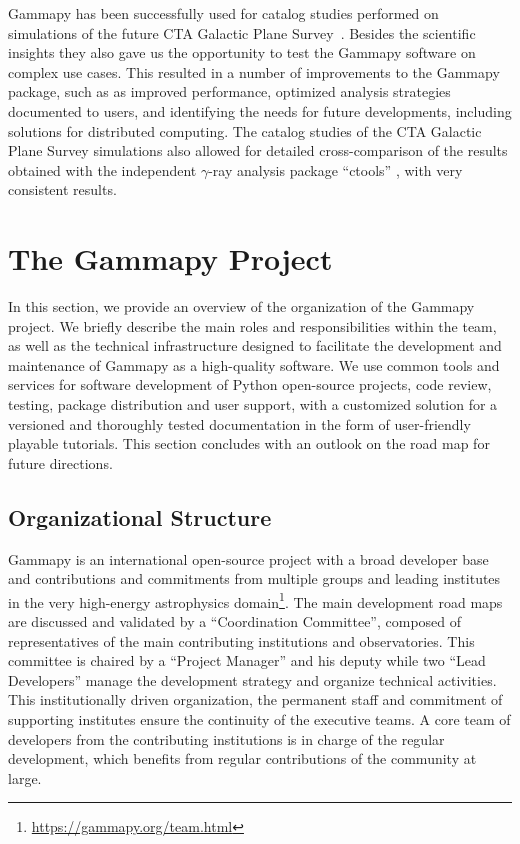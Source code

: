\documentclass[longauth]{aa}
\newcommand{\gammapy}{Gammapy\xspace}
\newcommand{\cta}{CTA\xspace}
\newcommand{\gammaray}{$\gamma$-ray\xspace}
\begin{document}
\gammapy has been successfully used for catalog studies performed on simulations
of the future \cta Galactic Plane Survey~\citep{Remy2021}. Besides the scientific
insights they also gave us the opportunity to test the \gammapy software on complex
use cases. This resulted in a number of improvements to the \gammapy package, such as
as improved performance, optimized analysis strategies documented to users, and
identifying the needs for future developments, including solutions for distributed
computing. The catalog studies of the \cta Galactic Plane Survey simulations
also allowed for detailed cross-comparison of the results obtained with the independent
\gammaray analysis package \enquote{ctools} \citep{2016A&A...593A...1K}, with very consistent 
results.

\section{The \gammapy Project} \label{sec:gammapy-project}

In this section, we provide an overview of the organization of the \gammapy
project. We briefly describe the main roles and responsibilities within the
team, as well as the technical infrastructure designed to facilitate the
development and maintenance of \gammapy as a high-quality software. We use
common tools and services for software development of Python open-source
projects, code review, testing, package distribution and user support, with a
customized solution for a versioned and thoroughly tested documentation in the form
of user-friendly playable tutorials. This section concludes with an outlook on
the road map for future directions.

\subsection{Organizational Structure}
\label{ssec:organizational-structure}

\gammapy is an international open-source project with a broad
developer base and contributions and commitments from multiple groups and
leading institutes in the very high-energy astrophysics
domain\footnote{\url{https://gammapy.org/team.html}}. The main development
road maps are discussed and validated by a \enquote{Coordination Committee}, composed of
representatives of the main contributing institutions and observatories.
This committee is
chaired by a \enquote{Project Manager} and his deputy while two \enquote{Lead Developers} manage
the development strategy and organize technical activities. This
institutionally driven organization, the permanent staff and commitment of
supporting institutes ensure the continuity of the executive teams. A core team
of developers from the contributing institutions is in charge of the regular
development, which benefits from regular contributions of the community at
large.
\end{document}
